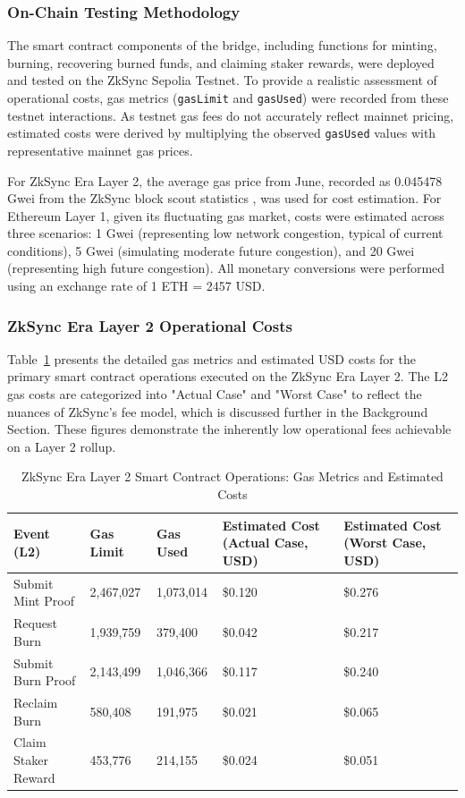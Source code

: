 \documentclass{DESSThesis}
\begin{document}
\subsubsection{On-Chain Testing Methodology}
The smart contract components of the bridge, including functions for minting, burning, recovering burned funds, and claiming staker rewards, were deployed and tested on the ZkSync Sepolia Testnet. To provide a realistic assessment of operational costs, gas metrics (\texttt{gasLimit} and \texttt{gasUsed}) were recorded from these testnet interactions. As testnet gas fees do not accurately reflect mainnet pricing, estimated costs were derived by multiplying the observed \texttt{gasUsed} values with representative mainnet gas prices.

For ZkSync Era Layer 2, the average gas price from June, recorded as 0.045478 Gwei from the ZkSync block scout statistics \cite{noauthor_zksync_nodate}, was used for cost estimation. For Ethereum Layer 1, given its fluctuating gas market, costs were estimated across three scenarios: 1 Gwei (representing low network congestion, typical of current conditions), 5 Gwei (simulating moderate future congestion), and 20 Gwei (representing high future congestion). All monetary conversions were performed using an exchange rate of 1 ETH = 2457 USD.

\subsubsection{ZkSync Era Layer 2 Operational Costs}
Table~\ref{tab:l2_gas_metrics} presents the detailed gas metrics and estimated USD costs for the primary smart contract operations executed on the ZkSync Era Layer 2. The L2 gas costs are categorized into "Actual Case" and "Worst Case" to reflect the nuances of ZkSync's fee model, which is discussed further in the Background Section. These figures demonstrate the inherently low operational fees achievable on a Layer 2 rollup.

\begin{table}[h!]
\caption{ZkSync Era Layer 2 Smart Contract Operations: Gas Metrics and Estimated Costs}
\label{tab:l2_gas_metrics}
\centering
\begin{tabularx}{\textwidth}{|X|X|X|X|X|} %
\hline
\textbf{Event (L2)} & \textbf{Gas Limit} & \textbf{Gas Used} & \textbf{Estimated Cost (Actual Case, USD)} & \textbf{Estimated Cost (Worst Case, USD)} \\
\hline
Submit Mint Proof & 2,467,027 & 1,073,014 & \$0.120 & \$0.276 \\
\hline
Request Burn & 1,939,759 & 379,400 & \$0.042 & \$0.217 \\
\hline
Submit Burn Proof & 2,143,499 & 1,046,366 & \$0.117 & \$0.240 \\
\hline
Reclaim Burn & 580,408 & 191,975 & \$0.021 & \$0.065 \\
\hline
Claim Staker Reward & 453,776 & 214,155 & \$0.024 & \$0.051 \\
\hline
\end{tabularx}
\end{table}
\end{document}
